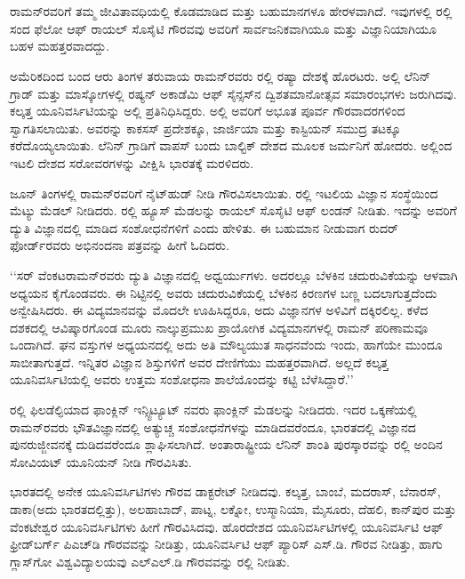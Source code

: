 
\chapter{}


ರಾಮನ್‍ರವರಿಗೆ ತಮ್ಮ ಜೀವಿತಾವಧಿಯಲ್ಲಿ ಕೊಡಮಾಡಿದ ಮತ್ತು ಬಹುಮಾನಗಳೂ ಹೇರಳವಾಗಿದೆ. ಇವುಗಳಲ್ಲಿ  ರಲ್ಲಿ ಸಂದ ಫೆಲೋ ಆಫ್ ರಾಯಲ್ ಸೊಸೈಟಿ ಗೌರವವು ಅವರಿಗೆ ಸಾರ್ವಜನಿಕವಾಗಿಯೂ ಮತ್ತು ವಿಜ್ಞಾನಿಯಾಗಿಯೂ ಬಹಳ ಮಹತ್ತರವಾದದ್ದು.

ಅಮೆರಿಕದಿಂದ ಬಂದ ಆರು ತಿಂಗಳ ತರುವಾಯ ರಾಮನ್‌ರವರು  ರಲ್ಲಿ ರಷ್ಯಾ ದೇಶಕ್ಕೆ ಹೊರಟರು. ಅಲ್ಲಿ ಲೆನಿನ್ ಗ್ರಾಡ್ ಮತ್ತು ಮಾಸ್ಕೋಗಳಲ್ಲಿ ರಷ್ಯನ್ ಅಕಾಡೆಮಿ ಆಫ್ ಸೈನ್ಸಸ್‌ನ ದ್ವಿಶತಮಾನೋತ್ಸವ ಸಮಾರಂಭಗಳು ಜರುಗಿದವು. ಕಲ್ಕತ್ತ ಯೂನಿವರ್ಸಿಟಿಯನ್ನು ಅಲ್ಲಿ ಪ್ರತಿನಿಧಿಸಿದ್ದರು. ಅಲ್ಲಿ ಅವರಿಗೆ ಅಭೂತ ಪೂರ್ವ ಗೌರವಾದರಗಳಿಂದ ಸ್ವಾಗತಿಸಲಾಯಿತು. ಅವರನ್ನು ಕಾಕಸಸ್ ಪ್ರದೇಶಕ್ಕೂ, ಜಾರ್ಜಿಯಾ ಮತ್ತು ಕಾಸ್ಟಿಯನ್ ಸಮುದ್ರ ತಟಕ್ಕೂ ಕರೆದೊಯ್ಯಲಾಯಿತು. ಲೆನಿನ್ ಗ್ರಾಡಿಗೆ ವಾಪಸ್ ಬಂದು ಬಾಲ್ಟಿಕ್ ದೇಶದ ಮೂಲಕ ಜರ್ಮನಿಗೆ ಹೋದರು. ಅಲ್ಲಿಂದ ಇಟಲಿ ದೇಶದ ಸರೋವರಗಳನ್ನು ವೀಕ್ಷಿಸಿ ಭಾರತಕ್ಕೆ ಮರಳಿದರು. 

 ಜೂನ್ ತಿಂಗಳಲ್ಲಿ ರಾಮನ್‍ರವರಿಗೆ ನೈಟ್‌ಹುಡ್ ನೀಡಿ ಗೌರವಿಸಲಾಯಿತು.  ರಲ್ಲಿ ಇಟಲಿಯ ವಿಜ್ಞಾನ ಸಂಸ್ಥೆಯಿಂದ ಮೆಟ್ಯು ಮೆಡಲ್ ನೀಡಿದರು.  ರಲ್ಲಿ ಹ್ಯೂಸ್ ಮೆಡಲನ್ನು ರಾಯಲ್ ಸೊಸೈಟಿ ಆಫ್ ಲಂಡನ್ ನೀಡಿತು. ಇದನ್ನು ಅವರಿಗೆ ದ್ಯುತಿ ವಿಜ್ಞಾನದಲ್ಲಿ ಮಾಡಿದ ಸಂಶೋಧನೆಗಳಿಗೆ ಎಂದು ಹೇಳಿತು. ಈ ಬಹುಮಾನ ನೀಡುವಾಗ ರುದರ್ ಫೋರ್ಡ್‌ರವರು ಅಭಿನಂದನಾ ಪತ್ರವನ್ನು ಹೀಗೆ ಓದಿದರು.

‘‘ಸರ್ ವೆಂಕಟರಾಮನ್‌ರವರು ದ್ಯುತಿ ವಿಜ್ಞಾನದಲ್ಲಿ ಅಧ್ವರ್ಯುಗಳು. ಅದರಲ್ಲೂ ಬೆಳಕಿನ ಚದುರುವಿಕೆಯನ್ನು ಆಳವಾಗಿ ಅಧ್ಯಯನ ಕೈಗೊಂಡವರು. ಈ ನಿಟ್ಟಿನಲ್ಲಿ ಅವರು ಚದುರುವಿಕೆಯಲ್ಲಿ ಬೆಳಕಿನ ಕಿರಣಗಳ ಬಣ್ಣ ಬದಲಾಗುತ್ತದೆಂದು ಅನ್ವೇಷಿಸಿದರು. ಈ ವಿದ್ಯಮಾನವನ್ನು ಮೊದಲೇ ಊಹಿಸಿದ್ದರೂ, ಅದು ವಿಜ್ಞಾನಗಳ ಅಳಿವಿಗೆ ದಕ್ಕಿರಲಿಲ್ಲ. ಕಳೆದ ದಶಕದಲ್ಲಿ ಆವಿಷ್ಕಾರಗೊಂಡ ಮೂರು ನಾಲ್ಕುಪ್ರಮುಖ ಪ್ರಾಯೋಗಿಕ ವಿದ್ಯಮಾನಗಳಲ್ಲಿ ರಾಮನ್ ಪರಿಣಾಮವೂ ಒಂದಾಗಿದೆ. ಘನ ವಸ್ತುಗಳ ಅಧ್ಯಯನದಲ್ಲಿ ಅದು ಅತಿ ಮೌಲ್ಯಯುತ ಸಾಧನವೆಂದು ಇಂದು, ಹಾಗೆಯೇ ಮುಂದೂ ಸಾಬೀತಾಗುತ್ತದೆ. ಇನ್ನಿತರ ವಿಜ್ಞಾನ ಶಿಸ್ತುಗಳಿಗೆ ಅವರ ದೇಣಿಗೆಯು ಮಹತ್ತರವಾಗಿದೆ. ಅಲ್ಲದೆ ಕಲ್ಕತ್ತ ಯೂನಿವರ್ಸಿಟಿಯಲ್ಲಿ ಅವರು ಉತ್ತಮ ಸಂಶೋಧನಾ ಶಾಲೆಯೊಂದನ್ನು ಕಟ್ಟಿ ಬೆಳೆಸಿದ್ದಾರೆ.’’

ರಲ್ಲಿ ಫಿಲಡೆಲ್ಫಿಯಾದ ಫಾಂಕ್ಲಿನ್ ಇನ್ಸ್ಟಿಟ್ಯೂಟ್ ನವರು ಫಾಂಕ್ಲಿನ್ ಮೆಡಲನ್ನು ನೀಡಿದರು. ಇದರ ಒಕ್ಕಣೆಯಲ್ಲಿ ರಾಮನ್‌ರವರು ಭೌತವಿಜ್ಞಾನದಲ್ಲಿ ಅತ್ಯುಚ್ಚ ಸಂಶೋಧನೆಗಳನ್ನು ಮಾಡಿದವರೆಂದೂ, ಭಾರತದಲ್ಲಿ ವಿಜ್ಞಾನದ ಪುನರುಜ್ಜೀವನಕ್ಕೆ ದುಡಿದವರೆಂದೂ ಶ್ಲಾಘಿಸಲಾಗಿದೆ. ಅಂತಾರಾಷ್ಟ್ರೀಯ ಲೆನಿನ್ ಶಾಂತಿ ಪುರಸ್ಕಾರವನ್ನು  ರಲ್ಲಿ ಅಂದಿನ ಸೋವಿಯಟ್ ಯೂನಿಯನ್ ನೀಡಿ ಗೌರವಿಸಿತು.

ಭಾರತದಲ್ಲಿ ಅನೇಕ ಯೂನಿವರ್ಸಿಟಿಗಳು ಗೌರವ ಡಾಕ್ಟರೇಟ್ ನೀಡಿದವು. ಕಲ್ಕತ್ತ, ಬಾಂಬೆ, ಮದರಾಸ್, ಬೆನಾರಸ್, ಡಾಕಾ(ಅದು ಭಾರತದಲ್ಲಿತ್ತು), ಅಲಹಾಬಾದ್, ಪಾಟ್ನ, ಲಕ್ನೋ, ಉಸ್ಮಾನಿಯಾ, ಮೈಸೂರು, ದೆಹಲಿ, ಕಾನ್‌ಪುರ ಮತ್ತು ವೆಂಕಟೇಶ್ವರ ಯೂನಿವರ್ಸಿಟಿಗಳು ಹೀಗೆ ಗೌರವಿಸಿದವು. ಹೊರದೇಶದ ಯೂನಿವರ್ಸಿಟಿಗಳಲ್ಲಿ ಯೂನಿವರ್ಸಿಟಿ ಆಫ್ ಫ್ರೀಡ್‌ಬರ್ಗ್ ಪಿಎಚ್‌ಡಿ ಗೌರವವನ್ನು ನೀಡಿತ್ತು, ಯೂನಿವರ್ಸಿಟಿ ಆಫ್ ಪ್ಯಾರಿಸ್ ಎಸ್.ಡಿ. ಗೌರವ ನೀಡಿತ್ತು, ಹಾಗು ಗ್ಲಾಸ್‌ಗೋ ವಿಶ್ವವಿದ್ಯಾಲಯವು ಎಲ್ಎಲ್.ಡಿ ಗೌರವವನ್ನು  ರಲ್ಲಿ ನೀಡಿತು. 

